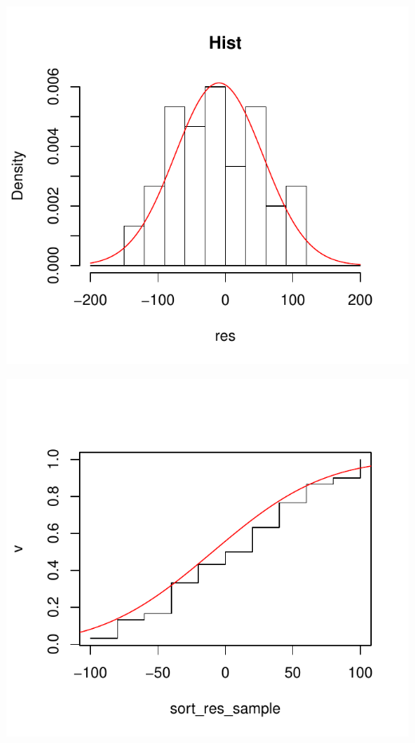 \documentclass{article}\usepackage[]{graphicx}\usepackage[]{color}
\makeatletter
\def\maxwidth{ %
  \ifdim\Gin@nat@width>\linewidth
    \linewidth
  \else
    \Gin@nat@width
  \fi
}
\newenvironment{knitrout}{}{} %
\makeatother
\begin{document}
\begin{knitrout}
\color{fgcolor}
\includegraphics[width=\maxwidth]{figure/unnamed-chunk-12-1} 

\includegraphics[width=\maxwidth]{figure/unnamed-chunk-12-2} 

\end{knitrout}
\end{document}
